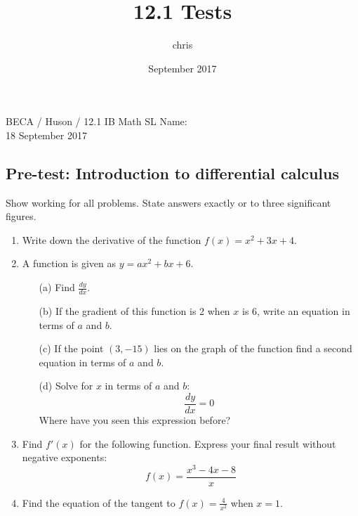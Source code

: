 \documentclass{article}
\title{12.1 Tests}
\author{chris }
\date{September 2017}
\begin{document}
\noindent BECA / Huson / 12.1 IB Math SL \qquad \qquad Name:\\
18 September 2017
\subsection*{Pre-test: Introduction to differential calculus}
Show working for all problems. State answers exactly or to three significant figures.

\begin{enumerate}

\item Write down the derivative of the function $f(x) = x^2 + 3x + 4$.

\item	A function is given as $y = ax^2 + bx + 6$.

\begin{itemize}
    \item[(a)] Find $\displaystyle \frac {dy}{dx}$.
	\item[(b)] If the gradient of this function is 2 when $x$ is 6, write an equation in terms of $a$ and $b$.
	\item[(c)] If the point $(3, -15)$ lies on the graph of the function find a second equation in terms of $a$ and $b$.
	\item[(d)] Solve for $x$ in terms of $a$ and $b$: 
	\[\frac {dy}{dx}=0\]
	Where have you seen this expression before?
\end{itemize}

\item Find $f'(x)$  for the following function. Express your final result without negative exponents:
	 \[	f(x) = \frac{x^3-4x-8}{x}\]
	 
\item Find the equation of the tangent to $\displaystyle f(x) = \frac{4}{x^2}$ when $x = 1$.
	 

\end{enumerate}
\end{document}
